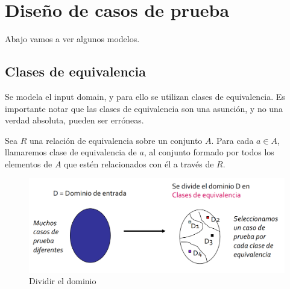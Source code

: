 \chapter{Diseño de casos de prueba}
\begin{figure}[htbp]
   \centering
\end{figure}


Abajo vamos a ver algunos modelos.

\section{Clases de equivalencia}

Se modela el input domain, y para ello se utilizan clases de equivalencia.
Es importante notar que las clases de equivalencia son una asunción, y no una verdad absoluta,  pueden ser erróneas.
\begin{paracol}{2}
   
   \colfill
   Sea $R$ una relación de equivalencia sobre un
   conjunto $A$. Para cada $a \in A$, llamaremos
   clase de equivalencia de $a$, al conjunto
   formado por todos los elementos de $A$ que
   estén relacionados con él a través de $R$.
   \colfill
   
   \switchcolumn

   \begin{figure}[htbp]
      \centering
      \includegraphics[width=0.9\columnwidth]{images/05/claseequivalencia.png}
      \caption{Dividir el dominio}
      \label{fig:05/claseequivalencia}
   \end{figure}
\end{paracol}

